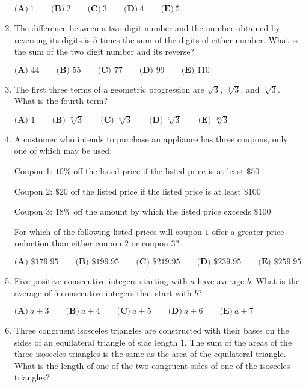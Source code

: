 \documentclass{article}
\begin{document}
\begin{enumerate}[label=\arabic*., itemsep=0.5em]
\( \textbf{(A)}\ 1\qquad\textbf{(B)}\ 2\qquad\textbf{(C)}\ 3\qquad\textbf{(D)}\ 4\qquad\textbf{(E)}\ 5\)\par \vspace{0.5em}\item The difference between a two-digit number and the number obtained by reversing its digits is \(5\) times the sum of the digits of either number.  What is the sum of the two digit number and its reverse?

\(\textbf{(A) }44\qquad
\textbf{(B) }55\qquad
\textbf{(C) }77\qquad
\textbf{(D) }99\qquad
\textbf{(E) }110\)\par \vspace{0.5em}\item The first three terms of a geometric progression are \(\sqrt 3\), \(\sqrt[3]3\), and \(\sqrt[6]3\).  What is the fourth term?

\(\textbf{(A) }1\qquad
\textbf{(B) }\sqrt[7]3\qquad
\textbf{(C) }\sqrt[8]3\qquad
\textbf{(D) }\sqrt[9]3\qquad
\textbf{(E) }\sqrt[10]3\qquad\)\par \vspace{0.5em}\item A customer who intends to purchase an appliance has three coupons, only one of which may be used:

Coupon 1: \(10\%\) off the listed price if the listed price is at least \(\$50\)

Coupon 2: \(\$20\) off the listed price if the listed price is at least \(\$100\)

Coupon 3: \(18\%\) off the amount by which the listed price exceeds \(\$100\)

For which of the following listed prices will coupon \(1\) offer a greater price reduction than either coupon \(2\) or coupon \(3\)?

\(\textbf{(A) }\$179.95\qquad
\textbf{(B) }\$199.95\qquad
\textbf{(C) }\$219.95\qquad
\textbf{(D) }\$239.95\qquad
\textbf{(E) }\$259.95\qquad\)\par \vspace{0.5em}\item Five positive consecutive integers starting with \(a\) have average \(b\). What is the average of \(5\) consecutive integers that start with \(b\)?

\( \textbf{(A)}\ a+3\qquad\textbf{(B)}\ a+4\qquad\textbf{(C)}\ a+5\qquad\textbf{(D)}\ a+6\qquad\textbf{(E)}\ a+7\)\par \vspace{0.5em}\item Three congruent isosceles triangles are constructed with their bases on the sides of an equilateral triangle of side length \(1\).  The sum of the areas of the three isosceles triangles is the same as the area of the equilateral triangle.  What is the length of one of the two congruent sides of one of the isosceles triangles?


\end{enumerate}
\end{document}
